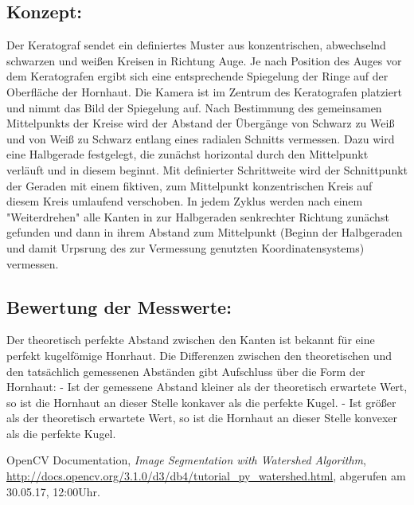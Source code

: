 \documentclass{../Vorlage/sebDenCls}
\begin{document}
\subsection{Konzept:}
Der Keratograf sendet ein definiertes Muster aus konzentrischen, abwechselnd schwarzen und weißen Kreisen in Richtung Auge. Je nach Position des Auges vor dem Keratografen ergibt sich eine entsprechende Spiegelung der Ringe auf der Oberfläche der Hornhaut. Die Kamera ist im Zentrum des Keratografen platziert und nimmt das Bild der Spiegelung auf. Nach Bestimmung des gemeinsamen Mittelpunkts der Kreise wird der Abstand der Übergänge von Schwarz zu Weiß und von Weiß zu Schwarz entlang eines radialen Schnitts vermessen. Dazu wird eine Halbgerade festgelegt, die zunächst horizontal durch den Mittelpunkt verläuft und in diesem beginnt. Mit definierter Schrittweite wird der Schnittpunkt der Geraden mit einem fiktiven, zum Mittelpunkt konzentrischen Kreis auf diesem Kreis umlaufend verschoben. In jedem Zyklus werden nach einem "Weiterdrehen" alle Kanten in zur Halbgeraden senkrechter Richtung zunächst gefunden und dann in ihrem Abstand zum Mittelpunkt (Beginn der Halbgeraden und damit Urpsrung des zur Vermessung genutzten Koordinatensystems) vermessen. 

\subsection{Bewertung der Messwerte:}
Der theoretisch perfekte Abstand zwischen den Kanten ist bekannt für eine perfekt kugelfömige Honrhaut. Die Differenzen zwischen den theoretischen und den tatsächlich gemessenen Abständen gibt Aufschluss über die Form der Hornhaut: 
- Ist der gemessene Abstand kleiner als der theoretisch erwartete Wert, so ist die Hornhaut an dieser Stelle konkaver als die perfekte Kugel.
- Ist größer als der theoretisch erwartete Wert, so ist die Hornhaut an dieser Stelle konvexer als die perfekte Kugel.

\begin{thebibliography}{9}
	
		OpenCV Documentation,
		\emph{Image Segmentation with Watershed Algorithm},
		\url{http://docs.opencv.org/3.1.0/d3/db4/tutorial_py_watershed.html},
		abgerufen am 30.05.17, 12:00Uhr.
	
\end{thebibliography}
\end{document}
